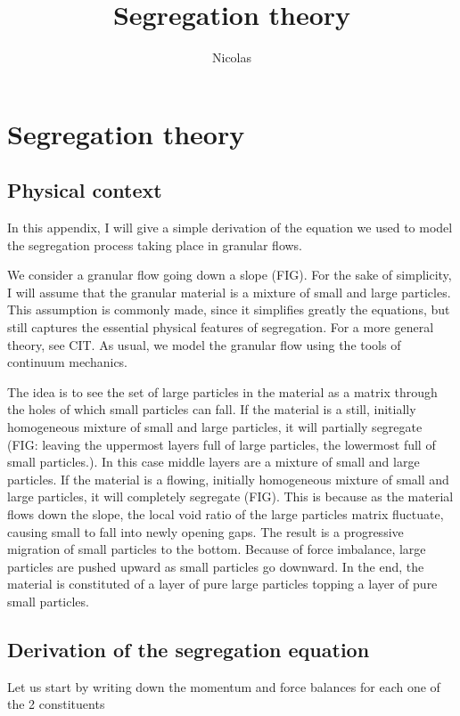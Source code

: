\documentclass[11pt]{book}
\title{\textbf{Segregation theory}}
\author{Nicolas}
\date{}
\begin{document}
\chapter{Segregation theory}

\section{Physical context}

In this appendix, I will give a simple derivation of the equation we used to model the segregation process taking place in granular flows.

We consider a granular flow going down a slope (FIG). For the sake of simplicity, I will assume that the granular material is a mixture of small and large particles. This assumption is commonly made, since it simplifies greatly the equations, but still captures the essential physical features of segregation. For a more general theory, see CIT.
As usual, we model the granular flow using the tools of continuum mechanics. 

The idea is to see the set of large particles in the material as a matrix through the holes of which small particles can fall. 
If the material is a still, initially homogeneous mixture of small and large particles, it will partially segregate (FIG: leaving the uppermost layers full of large particles, the lowermost full of small particles.). In this case middle layers are a mixture of small and large particles.
If the material is a flowing, initially homogeneous mixture of small and large particles, it will completely segregate (FIG). This is because as the material flows down the slope, the local void ratio of the large particles matrix fluctuate, causing small to fall into newly opening gaps. The result is a progressive migration of small particles to the bottom. Because of force imbalance, large particles are pushed upward as small particles go downward. In the end, the material is constituted of a layer of pure large particles topping a layer of pure small particles.

\section{Derivation of the segregation equation}

Let us start by writing down the momentum and force balances for each one of the 2 constituents
\end{document}
